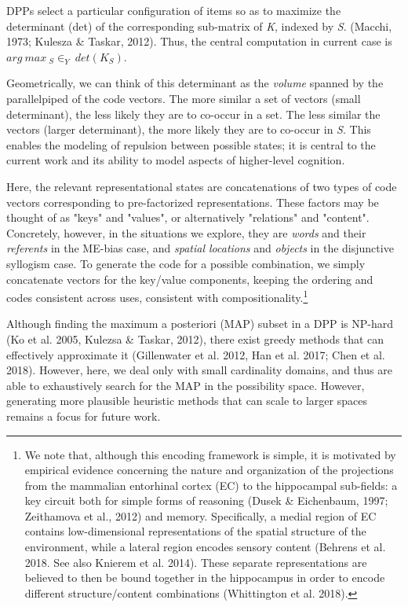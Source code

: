 \documentclass[10pt,letterpaper]{article}
\begin{document}
DPPs select a particular configuration of items so as to maximize the determinant (det) of the corresponding sub-matrix of \textit{K}, indexed by \textit{S}. (Macchi, 1973; Kulesza & Taskar, 2012). Thus, the central computation in current case is \(arg\ max \ _S\in_Y \ det(K _{S})\).

Geometrically, we can think of this determinant as the \textit{volume} spanned by the parallelpiped of the code vectors.  The more similar a set of vectors (small determinant), the less likely they are to co-occur in a set. The less similar the vectors (larger determinant), the more likely they are to co-occur in \textit{S}. This enables the modeling of repulsion between possible states; it is central to the current work and its ability to model aspects of higher-level cognition. 
 
 Here, the relevant representational states are concatenations of two types of code vectors corresponding to pre-factorized representations. These factors may be thought of as "keys" and "values", or alternatively "relations" and "content". Concretely, however, in the situations we explore, they are \textit{words} and their \textit{referents} in the ME-bias case, and \textit{spatial locations} and \textit{objects} in the disjunctive syllogism case. To generate the code for a possible combination, we simply concatenate vectors for the key/value components, keeping the ordering and codes consistent across uses, consistent with compositionality.\footnote{We note that, although this encoding framework is simple, it is motivated by empirical evidence concerning the nature and organization of the projections from the mammalian entorhinal cortex (EC) to the hippocampal sub-fields: a key circuit both for simple forms of reasoning (Dusek & Eichenbaum, 1997; Zeithamova et al., 2012) and memory. Specifically, a medial region of EC contains low-dimensional representations of the spatial structure of the environment, while a lateral region encodes sensory content (Behrens et al. 2018. See also Knierem et al. 2014). These separate representations are believed to then be bound together in the hippocampus in order to encode different structure/content combinations (Whittington et al. 2018).}


 Although finding the maximum a posteriori (MAP) subset in a DPP is  NP-hard (Ko et al. 2005, Kulezsa \& Taskar, 2012), there exist greedy methods that can effectively approximate it (Gillenwater et al. 2012, Han et al. 2017; Chen et al. 2018). However, here, we deal only with small cardinality domains, and thus are able to exhaustively search for the MAP in the possibility space. However, generating more plausible heuristic methods that can scale to larger spaces remains a focus for future work.  
\end{document}
